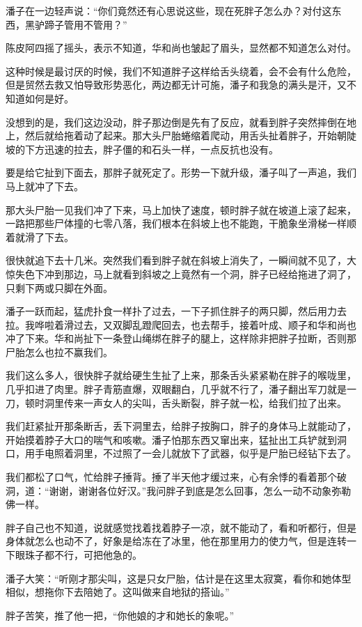 潘子在一边轻声说：“你们竟然还有心思说这些，现在死胖子怎么办？对付这东西，黑驴蹄子管用不管用？”

陈皮阿四摇了摇头，表示不知道，华和尚也皱起了眉头，显然都不知道怎么对付。

这种时候是最讨厌的时候，我们不知道胖子这样给舌头绕着，会不会有什么危险，但是贸然去救又怕导致形势恶化，两边都无计可施，潘子和我急的满头是汗，又不知道如何是好。

没想到的是，我们这边没动，胖子那边倒是先有了反应，就看到胖子突然摔倒在地上，然后就给拖着动了起来。那大头尸胎蜷缩着爬动，用舌头扯着胖子，开始朝陡坡的下方迅速的拉去，胖子僵的和石头一样，一点反抗也没有。

要是给它扯到下面去，那胖子就死定了。形势一下就升级，潘子叫了一声追，我们马上就冲了下去。

那大头尸胎一见我们冲了下来，马上加快了速度，顿时胖子就在坡道上滚了起来，一路把那些尸体撞的七零八落，我们根本在斜坡上也不能跑，干脆象坐滑梯一样顺着就滑了下去。

很快就追下去十几米。突然我们看到胖子就在斜坡上消失了，一瞬间就不见了，大惊失色下冲到那边，马上就看到斜坡之上竟然有一个洞，胖子已经给拖进了洞了，只剩下两或只脚在外面。

潘子一跃而起，猛虎扑食一样扑了过去，一下子抓住胖子的两只脚，然后用力去拉。我哗啦着滑过去，又双脚乱蹬爬回去，也去帮手，接着叶成、顺子和华和尚也冲了下来。华和尚扯下一条登山绳绑在胖子的腿上，这样除非把胖子拉断，否则那尸胎怎么也拉不赢我们。

我们这么多人，很快胖子就给硬生生扯了上来，那条舌头紧紧勒在胖子的喉咙里，几乎扣进了肉里。胖子青筋直爆，双眼翻白，几乎就不行了，潘子翻出军刀就是一刀，顿时洞里传来一声女人的尖叫，舌头断裂，胖子就一松，给我们拉了出来。

我们赶紧扯开那条断舌，丢下洞里去，给胖子按胸口，胖子的身体马上就能动了，开始摸着脖子大口的喘气和咳嗽。潘子怕那东西又窜出来，猛扯出工兵铲就到洞口，用手电照着洞里，不过照了一会儿就放下了武器，似乎是尸胎已经钻下去了。

我们都松了口气，忙给胖子捶背。捶了半天他才缓过来，心有余悸的看着那个破洞，道：“谢谢，谢谢各位好汉。”我问胖子到底是怎么回事，怎么一动不动象弥勒佛一样。

胖子自己也不知道，说就感觉找着找着脖子一凉，就不能动了，看和听都行，但是身体就怎么也动不了，好象是给冻在了冰里，他在那里用力的使力气，但是连转一下眼珠子都不行，可把他急的。

潘子大笑：“听刚才那尖叫，这是只女尸胎，估计是在这里太寂寞，看你和她体型相似，想拖你下去陪她了。这叫做来自地狱的搭讪。”

胖子苦笑，推了他一把，“你他娘的才和她长的象呢。”

